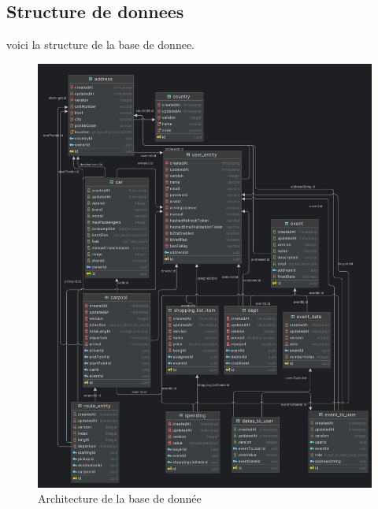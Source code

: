 \subsection{Structure de donnees}\label{subsec:structure-de-donnees}
voici la structure de la base de donnee.
\begin{figure}[h!]
    \includegraphics[width=\linewidth]{./images/dbShema}\caption{Architecture de la base de donnée}\label{fig:dbSchema2}
    \centering
\end{figure}
